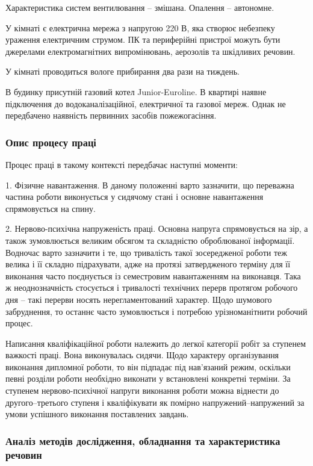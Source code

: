 Характеристика систем вентилювання – змішана. Опалення – автономне.

У кімнаті є електрична мережа з напругою 220 В, яка створює небезпеку ураження електричним струмом. ПК та периферійні пристрої можуть бути джерелами електромагнітних  випромінювань, аерозолів та шкідливих речовин.

У кімнаті проводиться вологе прибирання два рази на тиждень.

В будинку присутній газовий котел Junior-Euroline. В квартирі наявне підключення до водоканалізаційної, електричної та газової мереж. Однак не передбачено наявність первинних засобів пожежогасіння.


\subsubsection{Опис процесу праці}

Процес праці в такому контексті передбачає наступні моменти:

1. Фізичне навантаження. В даному положенні варто зазначити, що переважна частина роботи виконується у сидячому стані і основне навантаження спрямовується на спину.

2. Нервово-психічна напруженість праці. Основна напруга спрямовується на зір, а також зумовлюється великим обсягом та складністю оброблюваної інформації. Водночас варто зазначити і те, що тривалість такої зосередженої роботи теж велика і її складно підрахувати, адже на протязі затвердженого терміну для її виконання часто поєднується із семестровим навантаженням на виконавця. Така ж неоднозначність стосується і тривалості технічних перерв протягом робочого дня – такі перерви носять нерегламентований характер. Щодо шумового забруднення, то останнє часто зумовлюється і потребою урізноманітнити робочий процес.

Написання кваліфікаційної роботи належить до легкої категорії робіт за ступенем важкості праці. Вона виконувалась сидячи. Щодо характеру організування виконання дипломної роботи, то він підпадає під нав’язаний режим, оскільки певні розділи роботи необхідно виконати у встановлені конкретні терміни. За ступенем нервово-психічної напруги виконання роботи можна віднести до другого–третього ступеня і кваліфікувати як помірно напружений–напружений за умови успішного виконання поставлених завдань.

\subsubsection{Аналіз методів дослідження, обладнання та характеристика речовин}

